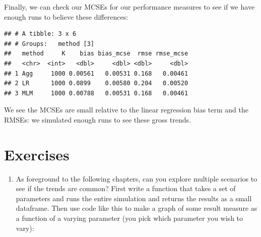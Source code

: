 \documentclass[
]{book}
\newenvironment{Shaded}{\begin{snugshade}}{\end{snugshade}}
\newcommand{\AttributeTok}[1]{\textcolor[rgb]{0.77,0.63,0.00}{#1}}
\newcommand{\FunctionTok}[1]{\textcolor[rgb]{0.00,0.00,0.00}{#1}}
\newcommand{\NormalTok}[1]{#1}
\newcommand{\OtherTok}[1]{\textcolor[rgb]{0.56,0.35,0.01}{#1}}
\newcommand{\SpecialCharTok}[1]{\textcolor[rgb]{0.00,0.00,0.00}{#1}}
\newcommand{\StringTok}[1]{\textcolor[rgb]{0.31,0.60,0.02}{#1}}
\providecommand{\tightlist}{%
  \setlength{\itemsep}{0pt}\setlength{\parskip}{0pt}}
\begin{document}
Finally, we can check our MCSEs for our performance measures to see if we have enough runs to believe these differences:

\begin{Shaded}
\end{Shaded}

\begin{verbatim}
## # A tibble: 3 x 6
## # Groups:   method [3]
##   method     K    bias bias_mcse  rmse rmse_mcse
##   <chr>  <int>   <dbl>     <dbl> <dbl>     <dbl>
## 1 Agg     1000 0.00561   0.00531 0.168   0.00461
## 2 LR      1000 0.0899    0.00580 0.204   0.00520
## 3 MLM     1000 0.00788   0.00531 0.168   0.00461
\end{verbatim}

We see the MCSEs are small relative to the linear regression bias term and the RMSEs: we simulated enough runs to see these gross trends.

\hypertarget{exercises-2}{%
\section{Exercises}\label{exercises-2}}

\begin{enumerate}
\def\labelenumi{\arabic{enumi}.}
\tightlist
\item
  As foreground to the following chapters, can you explore multiple scenarios to see if the trends are common? First write a function that takes a set of parameters and runs the entire simulation and returns the results as a small dataframe.
  Then use code like this to make a graph of some result measure as a function of a varying parameter (you pick which parameter you wish to vary):
\end{enumerate}
\end{document}
